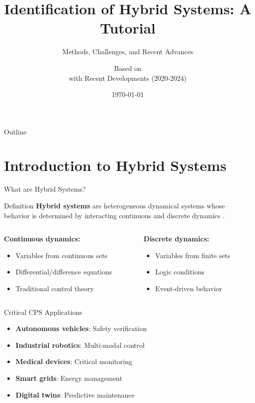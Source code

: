 \documentclass[aspectratio=169]{beamer}
\title[Hybrid System Identification]{Identification of Hybrid Systems: A Tutorial}
\subtitle{Methods, Challenges, and Recent Advances}
\author[Workshop]{Based on \cite{paoletti2007identification} \\ with Recent Developments (2020-2024)}
\institute{Workshop on Automata Learning}
\date{\today}
\begin{document}
\frame{\titlepage}

\begin{frame}{Outline}
\tableofcontents
\end{frame}

\section{Introduction to Hybrid Systems}

\begin{frame}{What are Hybrid Systems?}
\begin{block}{Definition}
\textbf{Hybrid systems} are heterogeneous dynamical systems whose behavior is determined by interacting continuous and discrete dynamics \cite{paoletti2007identification}.
\end{block}

\begin{columns}[t]
\begin{column}{0.5\textwidth}
\textbf{Continuous dynamics:}
\begin{itemize}
\item Variables from continuous sets
\item Differential/difference equations
\item Traditional control theory
\end{itemize}
\end{column}
\begin{column}{0.5\textwidth}
\textbf{Discrete dynamics:}
\begin{itemize}
\item Variables from finite sets
\item Logic conditions
\item Event-driven behavior
\end{itemize}
\end{column}
\end{columns}

\vspace{0.3cm}
\begin{exampleblock}{Critical CPS Applications}
\vspace{-0.2cm}
\begin{itemize}
\item \textbf{Autonomous vehicles}: Safety verification
\item \textbf{Industrial robotics}: Multi-modal control
\item \textbf{Medical devices}: Critical monitoring
\item \textbf{Smart grids}: Energy management
\item \textbf{Digital twins}: Predictive maintenance
\end{itemize}
\end{exampleblock}
\end{frame}
\end{document}
